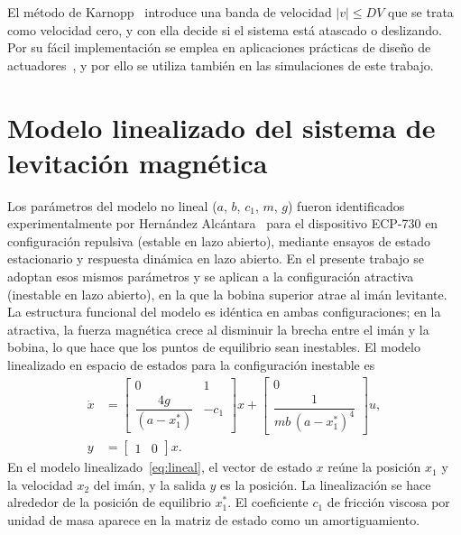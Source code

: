 El método de Karnopp~\cite{karnopp} introduce una banda de velocidad $|v| \le DV$ que se trata como velocidad cero, y con ella decide si el sistema está atascado o deslizando. Por su fácil implementación se emplea en aplicaciones prácticas de diseño de actuadores~\cite{liu,ravanbod,ravanbod1,bicakci,romano}, y por ello se utiliza también en las simulaciones de este trabajo.

\section{Modelo linealizado del sistema de levitación magnética}
Los parámetros del modelo no lineal ($a$, $b$, $c_1$, $m$, $g$) fueron identificados experimentalmente por Hernández Alcántara~\cite{diana_tesis} para el dispositivo ECP-730 en configuración repulsiva (estable en lazo abierto), mediante ensayos de estado estacionario y respuesta dinámica en lazo abierto. En el presente trabajo se adoptan esos mismos parámetros y se aplican a la configuración atractiva (inestable en lazo abierto), en la que la bobina superior atrae al imán levitante. La estructura funcional del modelo es idéntica en ambas configuraciones; en la atractiva, la fuerza magnética crece al disminuir la brecha entre el imán y la bobina, lo que hace que los puntos de equilibrio sean inestables. El modelo linealizado en espacio de estados para la configuración inestable es
\begin{equation}
\begin{aligned}
\dot{x}
&=
\begin{bmatrix}
0 & 1 \\[6pt]
\dfrac{4g}{(a-x_1^{\ast})} & -c_1
\end{bmatrix}x
+
\begin{bmatrix}
0 \\[6pt]
\dfrac{1}{mb\,(a-x_1^{\ast})^4}
\end{bmatrix}u,
\\[10pt]
y &= \begin{bmatrix} 1 & 0 \end{bmatrix} x .
\end{aligned}
\label{eq:lineal}
\end{equation}
En el modelo linealizado~\eqref{eq:lineal}, el vector de estado $x$ reúne la posición $x_1$ y la velocidad $x_2$ del imán, y la salida $y$ es la posición. La linealización se hace alrededor de la posición de equilibrio $x_1^{\ast}$. El coeficiente $c_1$ de fricción viscosa por unidad de masa aparece en la matriz de estado como un amortiguamiento.

